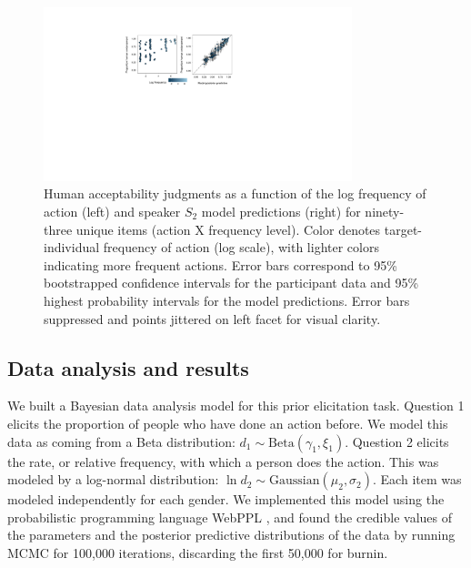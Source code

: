 \documentclass[10pt,letterpaper]{article}
\begin{document}
\begin{figure}[t]
\centering
  \includegraphics[width=0.8\textwidth]{tj-scatters}
  \caption{Human acceptability judgments as a function of the log frequency of action (left) and speaker $S_2$ model predictions (right) for ninety-three unique items (action X frequency level). 
  Color denotes target-individual frequency of action (log scale), with lighter colors indicating more frequent actions. Error bars correspond to 95\% bootstrapped confidence intervals for the participant data and 95\% highest probability intervals for the model predictions. Error bars suppressed and points jittered on left facet for visual clarity.}
  \label{fig:tjScatters}
\end{figure}


\subsection{Data analysis and results}
We built a Bayesian data analysis model for this prior elicitation task.
Question 1 elicits the proportion of people who have done an action before. 
We model this data as coming from a Beta distribution: $d_{1} \sim \text{Beta}(\gamma_{1}, \xi_{1})$. 
Question 2 elicits the rate, or relative frequency, with which a person does the action.
This was modeled by a log-normal distribution: $\ln d_{2} \sim \text{Gaussian}(\mu_{2}, \sigma_{2})$. 
Each item was modeled independently for each gender.
We implemented this model using the probabilistic programming language WebPPL \cite{dippl}, and found the credible values of the parameters and the posterior predictive distributions of the data by running MCMC for 100,000 iterations, discarding the first 50,000 for burnin.
%
\end{document}
